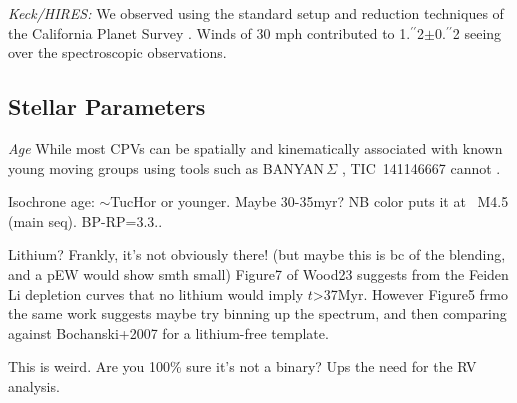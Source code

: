 \documentclass{nature3}
\newcommand{\farcs}{\mbox{\ensuremath{.\!\!^{\prime\prime}}}}%
\begin{document}
\begin{methods}
{\it Keck/HIRES:}
We observed using the standard setup and reduction techniques of the
California Planet Survey \cite{Howard2010}.
Winds of 30 mph contributed to
1\farcs2$\pm$0\farcs2 seeing over the spectroscopic observations.  

\subsection{Stellar Parameters}
{\it Age}
While most CPVs can be spatially and kinematically associated with known young
moving groups using tools such as BANYAN\,$\Sigma$ \cite[v1.2;][]{Gagne2018},
TIC~141146667 cannot \cite{Bouma2024}.

Isochrone age: $\sim$TucHor or younger.  Maybe 30-35myr?
NB color puts it at ~M4.5 (main seq).
BP-RP=3.3..

Lithium?
Frankly, it's not obviously there!  (but maybe this is bc of the blending, and
a pEW would show smth small)
Figure7 of Wood23 suggests from the Feiden Li depletion curves that no lithium would imply $t$>37Myr.
However Figure5 frmo the same work suggests maybe try binning up the spectrum, and then comparing against Bochanski+2007 for a lithium-free template.

This is weird.  Are you 100\% sure it's not a binary?  Ups the need for
the RV analysis.




\end{methods}
\end{document}
